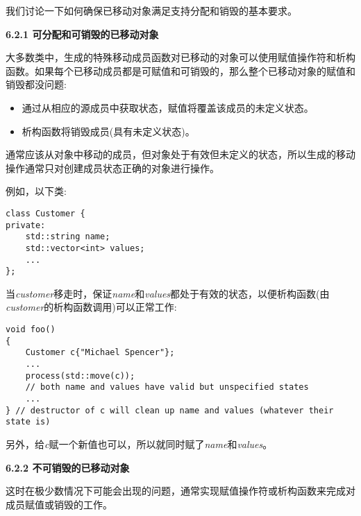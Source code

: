 我们讨论一下如何确保已移动对象满足支持分配和销毁的基本要求。\par

\hspace*{\fill} \par %
\textbf{6.2.1 可分配和可销毁的已移动对象}

大多数类中，生成的特殊移动成员函数对已移动的对象可以使用赋值操作符和析构函数。如果每个已移动成员都是可赋值和可销毁的，那么整个已移动对象的赋值和销毁都没问题:\par

\begin{itemize}
	\item 通过从相应的源成员中获取状态，赋值将覆盖该成员的未定义状态。
	\item 析构函数将销毁成员(具有未定义状态)。
\end{itemize}

通常应该从对象中移动的成员，但对象处于有效但未定义的状态，所以生成的移动操作通常只对创建成员状态正确的对象进行操作。\par

例如，以下类:\par

\begin{lstlisting}[caption={}]
class Customer {
private:
	std::string name;
	std::vector<int> values;
	...
};
\end{lstlisting}

当\textit{customer}移走时，保证\textit{name}和\textit{values}都处于有效的状态，以便析构函数(由\textit{customer}的析构函数调用)可以正常工作:\par

\begin{lstlisting}[caption={}]
void foo()
{
	Customer c{"Michael Spencer"};
	...
	process(std::move(c));
	// both name and values have valid but unspecified states
	...
} // destructor of c will clean up name and values (whatever their state is)
\end{lstlisting}

另外，给\textit{c}赋一个新值也可以，所以就同时赋了\textit{name}和\textit{values}。\par

\hspace*{\fill} \par %
\textbf{6.2.2 不可销毁的已移动对象}

这时在极少数情况下可能会出现的问题，通常实现赋值操作符或析构函数来完成对成员赋值或销毁的工作。\par

